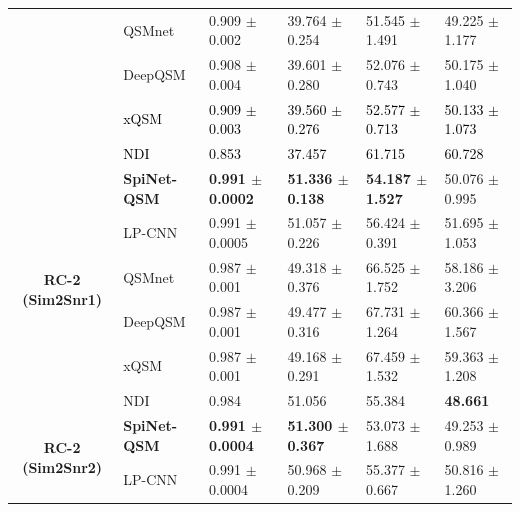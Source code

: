 \documentclass[sn-vancouver,Numbered]{sn-jnl}%
\begin{document}
\begin{table}[htbp]
{\begin{tabular}{clllll}
& QSMnet                
&0.909 $\pm$ 0.002      
&39.764 $\pm$ 0.254
&51.545 $\pm$ 1.491
&49.225 $\pm$ 1.177\\  

& DeepQSM               
&0.908 $\pm$ 0.004	            
&39.601 $\pm$ 0.280	                
&52.076 $\pm$ 0.743	              
&50.175 $\pm$ 1.040\\ 

&\textcolor{black}{ xQSM}               
&\textcolor{black}{0.909 $\pm$ 0.003}	     
&\textcolor{black}{39.560 $\pm$ 0.276}
&\textcolor{black}{52.577 $\pm$ 0.713}
&\textcolor{black}{50.133 $\pm$ 1.073}\\ 

&\textcolor{black}{ NDI}                              
&\textcolor{black}{0.853}	     
&\textcolor{black}{37.457}
&\textcolor{black}{61.715}
&\textcolor{black}{60.728}\\


\hline

\multirow{6}{*}{\textbf{RC-2 (Sim2Snr1)}}     
&\textbf{SpiNet-QSM}    
&\textbf{0.991 $\pm$ 0.0002 }	    
&\textbf{51.336 $\pm$ 0.138}	    
&\textbf{54.187 $\pm$ 1.527}      
&50.076 $\pm$ 0.995\\  

& LP-CNN                
&0.991 $\pm$ 0.0005	    
&51.057 $\pm$ 0.226
&56.424 $\pm$ 0.391	  
&51.695 $\pm$ 1.053\\ 

& QSMnet                
&0.987 $\pm$ 0.001      
&49.318 $\pm$ 0.376
&66.525 $\pm$ 1.752
&58.186 $\pm$ 3.206\\  

& DeepQSM               
&0.987 $\pm$ 0.001	            
&49.477 $\pm$ 0.316	                
&67.731 $\pm$ 1.264	              
&60.366 $\pm$ 1.567\\ 

& xQSM               
&0.987 $\pm$ 0.001	     
&49.168 $\pm$ 0.291
&67.459 $\pm$ 1.532
&59.363 $\pm$ 1.208\\ 

& NDI                              
&0.984	     
&51.056
&55.384
&\textbf{48.661}\\ 
\hline

\multirow{6}{*}{\textbf{RC-2 (Sim2Snr2)}}     
&\textbf{SpiNet-QSM}    
&\textbf{0.991 $\pm$ 0.0004}	    
&\textbf{51.300 $\pm$ 0.367}	    
&53.073 $\pm$ 1.688
&49.253 $\pm$ 0.989\\  

& LP-CNN                
&0.991 $\pm$ 0.0004	    
&50.968 $\pm$ 0.209
&55.377 $\pm$ 0.667	  
&50.816 $\pm$ 1.260\\ 


\end{tabular}}
\end{table}
\end{document}
